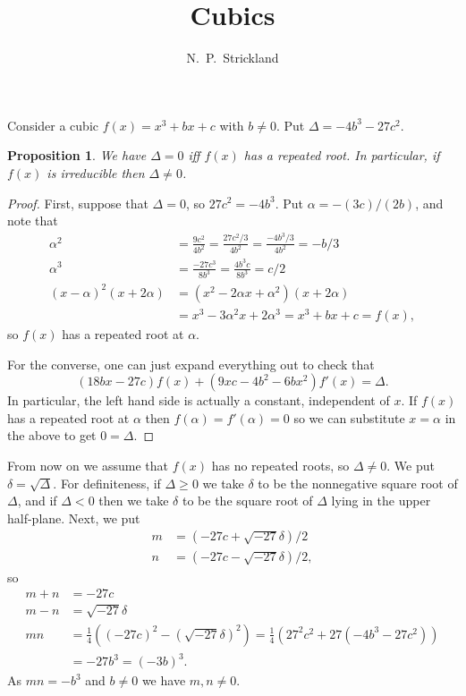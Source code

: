 \documentclass{amsart}
\newcommand{\al}        {\alpha}
\newcommand{\dl}        {\delta}
\newcommand{\Dl}        {\Delta}
\renewcommand{\:}{\colon}
\newtheorem{proposition}[theorem]{Proposition}
\theoremstyle{definition}
\begin{document}
\title{Cubics}
\author{N.~P.~Strickland}

\maketitle 

Consider a cubic $f(x)=x^3+bx+c$ with $b\neq 0$.  Put
$\Dl=-4b^3-27c^2$.  

\begin{proposition}\label{prop-discriminant}
 We have $\Dl=0$ iff $f(x)$ has a repeated root.  In particular, if
 $f(x)$ is irreducible then $\Dl\neq 0$.
\end{proposition}
\begin{proof}
 First, suppose that $\Dl=0$, so $27c^2=-4b^3$.  Put $\al=-(3c)/(2b)$,
 and note that 
 \begin{align*}
  \al^2 &= \frac{9c^2}{4b^2}= \frac{27c^2/3}{4b^2}
         = \frac{-4b^3/3}{4b^2} = -b/3 \\
  \al^3 &= \frac{-27c^3}{8b^3} = \frac{4b^3c}{8b^3} = c/2 \\  
  (x-\al)^2(x+2\al) &= (x^2-2\al x+\al^2)(x+2\al) \\
    &= x^3 - 3\al^2 x + 2\al^3 = x^3+bx+c = f(x),
 \end{align*}
 so $f(x)$ has a repeated root at $\al$.  

 For the converse, one can just expand everything out to check that 
 \[ (18bx-27c)f(x)+(9xc-4b^2-6bx^2)f'(x) = \Dl. \]
 In particular, the left hand side is actually a constant, independent
 of $x$.  If $f(x)$ has a repeated root at $\al$ then
 $f(\al)=f'(\al)=0$ so we can substitute $x=\al$ in the above to
 get $0=\Dl$. 
\end{proof}

From now on we assume that $f(x)$ has no repeated roots, so 
$\Dl\neq 0$.  We put $\dl=\sqrt{\Dl}$.  For definiteness, if 
$\Dl\geq 0$ we take $\dl$ to be the nonnegative square root of $\Dl$,
and if $\Dl<0$ then we take $\dl$ to be the square root of $\Dl$ lying
in the upper half-plane.  Next, we put
\begin{align*}
 m &= (-27c + \sqrt{-27}\dl)/2 \\
 n &= (-27c - \sqrt{-27}\dl)/2,
\end{align*}
so 
\begin{align*}
 m+n &= -27c \\
 m-n &= \sqrt{-27}\dl \\
 mn &= \tfrac{1}{4}((-27c)^2-(\sqrt{-27}\dl)^2) 
     = \tfrac{1}{4}(27^2c^2+27(-4b^3-27c^2)) \\
    &= -27b^3 = (-3b)^3.  
\end{align*}
As $mn=-b^3$ and $b\neq 0$ we have $m,n\neq 0$.
\end{document}
